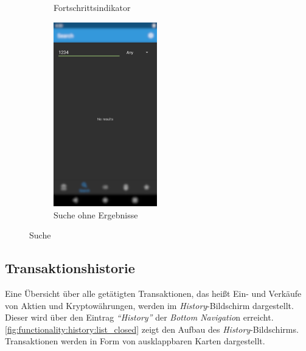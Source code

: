 \documentclass[a4paper]{article}
\begin{document}
\begin{figure}[H]
\begin{subfigure}{.5\textwidth}
		\caption{Fortschrittsindikator}
		\label{fig:functionality:search:loading}
	\end{subfigure}
	\begin{subfigure}{.5\textwidth}
		\centering
		\includegraphics[height=8cm,keepaspectratio]{./images/search/no_results.png}
		\caption{Suche ohne Ergebnisse}
		\label{fig:functionality:search:no-results}
	\end{subfigure}
	\caption{Suche}
	\label{fig:functionality:search}
\end{figure}


\subsection{Transaktionshistorie}
\label{subsec:functionality:history}
Eine Übersicht über alle getätigten Transaktionen, das heißt Ein- und Verkäufe von Aktien und Kryptowährungen, werden im \textit{History}-Bildschirm dargestellt.
Dieser wird über den Eintrag \textit{"`History"'} der \textit{Bottom Navigatio}n erreicht.
\autoref{fig:functionality:history:list_closed} zeigt den Aufbau des \textit{History}-Bildschirms.
Transaktionen werden in Form von ausklappbaren Karten dargestellt.
\end{document}
